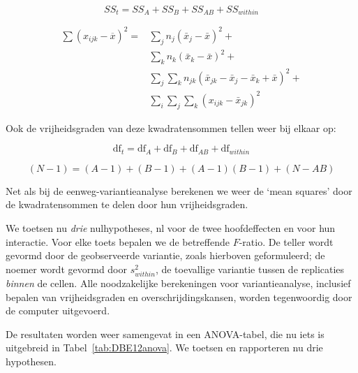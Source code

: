 \documentclass[
]{book}
\begin{document}
\begin{equation}
  \label{eq:SStotal2way-short}
    { SS_t } = SS_A + SS_B + SS_{AB} + SS_{within} 
\end{equation}

\begin{align}
  \label{eq:SStotal2way}
    { \sum (x_{ijk} - \overline{x})^2 } = &  { \sum_j n_j (\bar{x}_j - \bar{x})^2 } + \\ 
    & { \sum_k n_k (\bar{x}_k - \bar{x})^2 } +  \\
    & { \sum_j \sum_k n_{jk} (\bar{x}_{jk} - \bar{x}_j - \bar{x}_k + \bar{x})^2 } + \\
    & { \sum_i \sum_j \sum_k (x_{ijk} - \bar{x}_{jk})^2 } 
\end{align}

Ook de vrijheidsgraden van deze kwadratensommen tellen weer bij elkaar
op:

\begin{equation}
  \label{eq:dftotal2-short}
    { \textrm{df}_t } = \textrm{df}_A + \textrm{df}_B + \textrm{df}_{AB} + \textrm{df}_{within}
\end{equation}

\begin{equation}
  \label{eq:dftotal2}
    { (N-1) } = (A-1) + (B-1) + (A-1)(B-1) + (N-AB)
\end{equation}

Net als bij de eenweg-variantieanalyse berekenen we weer de `mean
squares' door de kwadratensommen te delen door hun vrijheidsgraden.

We toetsen nu \emph{drie} nulhypotheses, nl voor de twee hoofdeffecten en
voor hun interactie. Voor elke toets bepalen we de betreffende
\(F\)-ratio. De teller wordt gevormd door de geobserveerde variantie,
zoals hierboven geformuleerd; de noemer wordt gevormd door \(s^2_{within}\), de
toevallige variantie tussen de replicaties \emph{binnen} de cellen. Alle
noodzakelijke berekeningen voor variantieanalyse, inclusief bepalen van
vrijheidsgraden en overschrijdingskansen, worden tegenwoordig door de
computer uitgevoerd.

De resultaten worden weer samengevat in een ANOVA-tabel, die nu iets is
uitgebreid in Tabel~\ref{tab:DBE12anova}. We toetsen en rapporteren nu drie hypothesen.
\end{document}
